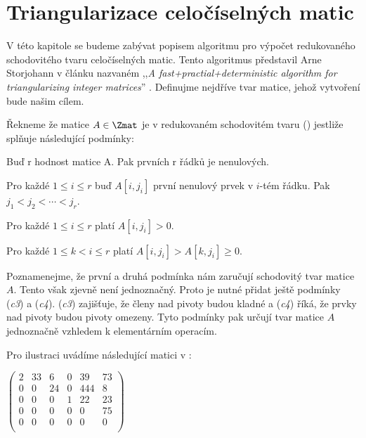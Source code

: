 \chapter{Triangularizace celočíselných matic}

V této kapitole se budeme zabývat popisem algoritmu pro výpočet redukovaného
schodovitého tvaru celočíselných matic. Tento algoritmus představil Arne Storjohann
v článku nazvaném ,,\textit{A fast+practial+deterministic algorithm for
triangularizing integer matrices}'' \cite{triang}. Definujme nejdříve tvar matice,
jehož vytvoření bude našim cílem.

\begin{defi}\label{RREF}
    Řekneme že matice $ A \in \Zmat $ je v redukovaném schodovitém tvaru (\rst) jestliže
    splňuje následující podmínky:
    \begin{Cond}
        \item Buď r hodnost matice A. Pak prvních r řádků je nenulových.
        \item Pro každé $ 1 \leq i \leq r $ buď $A[i, j_i]$ první nenulový prvek v
        $ i $-tém řádku. Pak $ j_1 < j_2 < \cdots < j_r $.
        \item Pro každé $ 1 \leq i \leq r $ platí $ A[i, j_i] > 0 $.
        \item Pro každé $ 1 \leq k < i \leq r $ platí $ A[i, j_i] > A[k, j_i] \geq 0 $.
    \end{Cond}
\end{defi}

\begin{pozn}
Poznamenejme, že první a druhá podmínka nám zaručují schodovitý tvar matice $ A $.
Tento však zjevně není jednoznačný. Proto je nutné přidat ještě podmínky
(\textit{c3}) a (\textit{c4}). (\textit{c3}) zajišťuje, že členy nad pivoty budou
kladné a (\textit{c4}) říká, že prvky nad pivoty budou pivoty omezeny. Tyto
podmínky pak určují tvar matice $ A $ jednoznačně vzhledem k elementárním
operacím.
\end{pozn}

\begin{pri}
Pro ilustraci uvádíme následující matici v \rst:
\begin{center}
$
    \begin{pmatrix}
        2 & 33 & 6  & 0 & 39  & 73 \\
        0 & 0  & 24 & 0 & 444 & 8  \\
        0 & 0  & 0  & 1 & 22  & 23 \\
        0 & 0  & 0  & 0 & 0   & 75 \\
        0 & 0  & 0  & 0 & 0   & 0  \\
    \end{pmatrix}
$
\end{center}
\end{pri}

